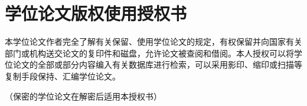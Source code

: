 
\chapter{学位论文版权使用授权书}
本学位论文作者完全了解{\universityname}有关保留、使用学位论文的规定，有权保留并向国家有关部门或机构送交论文的复印件和磁盘，允许论文被查阅和借阅。本人授权{\universityname}可以将学位论文的全部或部分内容编入有关数据库进行检索，可以采用影印、缩印或扫描等复制手段保持、汇编学位论文。


（保密的学位论文在解密后适用本授权书）
\vspace{4cm}
\autograph
